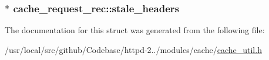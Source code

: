 \subsubsection[{\texorpdfstring{stale\+\_\+headers}{stale_headers}}]{$\ast$ cache\+\_\+request\+\_\+rec\+::stale\+\_\+headers}\hypertarget{structcache__request__rec_a7bdf3605a965ddd6b566babb830bde8b}{}\label{structcache__request__rec_a7bdf3605a965ddd6b566babb830bde8b}


The documentation for this struct was generated from the following file\+:\begin{DoxyCompactItemize}
\item 
/usr/local/src/github/\+Codebase/httpd-\/2../modules/cache/\hyperlink{cache__util_8h}{cache\+\_\+util.\+h}\end{DoxyCompactItemize}
